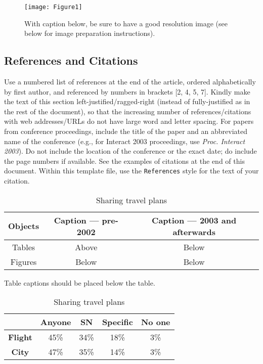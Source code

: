 \documentclass{scsPaperFormattingTemplate-LaTex-Revised20160302}
\newcommand\tabhead[1]{\small\textbf{#1}}
\begin{document}
\begin{figure}[!h]
\centering
\texttt{[image: Figure1]}
\caption{With caption below, be sure to have a good resolution image (see below for image preparation instructions).}
\label{fig:figure1}
\end{figure}

\subsection{References and Citations}

Use a numbered list of references at the end of the article, ordered alphabetically by first author, and referenced by numbers in brackets [2, 4, 5, 7]. Kindly make the text of this section left-justified/ragged-right (instead of fully-justified as in the rest of the document), so that the increasing number of references/citations with web addresses/URLs do not have large word and letter spacing. For papers from conference proceedings, include the title of the paper and an abbreviated name of the conference (e.g., for Interact 2003 proceedings, use \textit{Proc. Interact 2003}). Do not include the location of the conference or the exact date; do include the page numbers if available. See the examples of citations at the end of this document. Within this template file, use the \texttt{References} style
for the text of your citation.

\begin{table}
  \centering
  \begin{tabular}{|c|c|c|}
    \hline
    \tabhead{Objects} &
    \multicolumn{1}{|p{0.3\columnwidth}|}{\centering\tabhead{Caption --- pre-2002}} &
    \multicolumn{1}{|p{0.4\columnwidth}|}{\centering\tabhead{Caption --- 2003 and afterwards}} \\
    \hline
    Tables & Above & Below \\
    \hline
    Figures & Below & Below \\
    \hline
  \end{tabular}
  \caption{Table captions should be placed below the table.}
  \label{tab:table1}
  \hfill \break
  \centering
  \begin{tabular}{|c|c|c|c|c|}
	\hline
	\tabhead{} &
	\multicolumn{1}{|p{0.15\columnwidth}|}{\centering\tabhead{Anyone}} &
	\multicolumn{1}{|p{0.15\columnwidth}|}{\centering\tabhead{SN}} &
	\multicolumn{1}{|p{0.15\columnwidth}|}{\centering\tabhead{Specific}} &
	\multicolumn{1}{|p{0.15\columnwidth}|}{\centering\tabhead{No one}} \\
	\hline
	\textbf{Flight} & 45\% & 34\% & 18\% & 3\% \\
	\hline
	\textbf{City} & 47\% & 35\% & 14\% & 3\% \\
	\hline
  \end{tabular}
  \caption{Sharing travel plans}
  \label{tab:table2}
\end{table}
\end{document}
